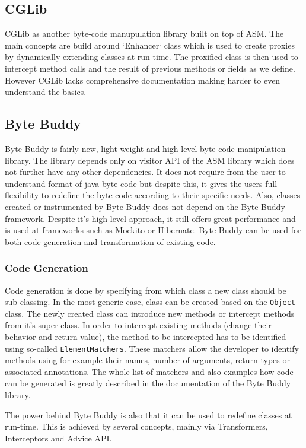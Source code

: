 \subsection{CGLib}
CGLib as another byte-code manupulation library built on top of ASM. The main concepts are build around `Enhancer` class which is used to create proxies by dynamically extending classes at run-time. The proxified class is then used to intercept method calls and the result of previous methods or fields as we define. However CGLib lacks comprehensive documentation making harder to even understand the basics.

\subsection{Byte Buddy}
\label{sec:byte_buddy}
Byte Buddy is fairly new, light-weight and high-level byte code manipulation library. The library depends only on visitor API of the ASM library which does not further have any other dependencies. It does not require from the user to understand format of java byte code but despite this, it gives the users full flexibility to redefine the byte code according to their specific needs. Also, classes created or instrumented by Byte Buddy does not depend on the Byte Buddy framework. Despite it's high-level approach, it still offers great performance and is used at frameworks such as Mockito or Hibernate. Byte Buddy can be used for both code generation and transformation of existing code.

\subsubsection{Code Generation}
Code generation is done by specifying from which class a new class should be sub-classing. In the most generic case, class can be created based on the \texttt{Object} class. The newly created class can introduce new methods or intercept methods from it's super class. In order to intercept existing methods (change their behavior and return value), the method to be intercepted has to be identified using so-called \texttt{ElementMatchers}. These matchers allow the developer to identify methods using for example their names, number of arguments, return types or associated annotations. The whole list of matchers and also examples how code can be generated is greatly described in the documentation of the Byte Buddy library.

The power behind Byte Buddy is also that it can be used to redefine classes at run-time. This is achieved by several concepts, mainly via Transformers, Interceptors and Advice API.
